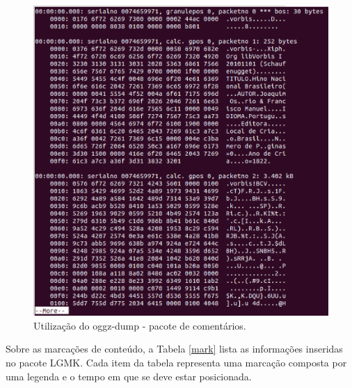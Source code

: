  \begin{figure}[ht]
	\centering
		\includegraphics[keepaspectratio=true,scale=0.4]{figuras/hnbogg.eps}
	\caption{Utilização do oggz-dump - pacote de comentários.}
	\label{meta}
\end{figure}

Sobre as marcações de conteúdo, a Tabela \ref{mark} lista as informações inseridas no pacote LGMK. Cada item da tabela representa uma marcação composta por uma legenda e o tempo em que se deve estar posicionada.

